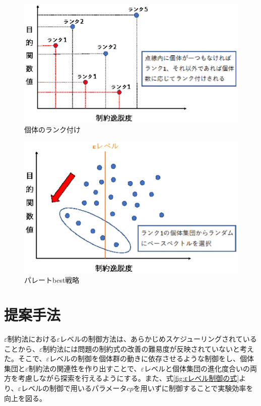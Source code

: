 \documentclass[a4paper,12pt]{jsreport}
\begin{document}
\begin{figure}[htbp]
  \centering
  \includegraphics[width=.9\linewidth]{fig3/paratebest2.eps}
  \caption{個体のランク付け}
  \label{fig:paratebest2}
\end{figure}

\begin{figure}[htbp]
  \centering
  \includegraphics[width=.9\linewidth]{fig3/paratebest.eps}
  \caption{パレートbest戦略}
  \label{fig:paratebest}
\end{figure}


\chapter{提案手法}

$\varepsilon$制約法における$\varepsilon$レベルの制御方法は、あらかじめスケジューリングされていることから、$\varepsilon$制約法には問題の制約式の改善の難易度が反映されていないと考えた。そこで、$\varepsilon$レベルの制御を個体群の動きに依存させるような制御をし、個体集団と$\varepsilon$制約法の関連性を作り出すことで、$\varepsilon$レベルと個体集団の進化度合いの両方を考慮しながら探索を行えるようにする。また、式\ref{fig:εレベル制御の式}より、$\varepsilon$レベルの制御で用いるパラメータ$cp$を用いずに制御することで実験効率を向上を図る。
\end{document}
